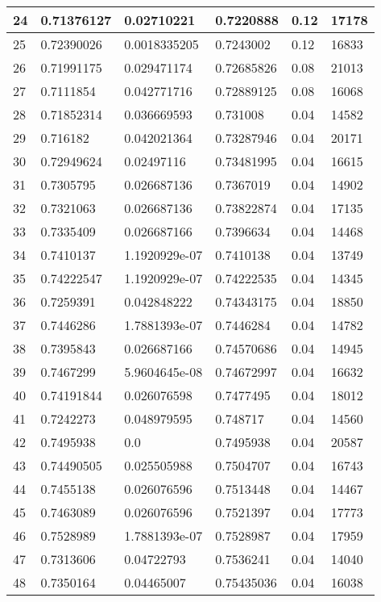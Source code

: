 \begin{longtable}{|l|l|l|l|l|l|}
24 & 0.71376127 & 0.02710221 & 0.7220888 & 0.12 & 17178 \\ \hline 
25 & 0.72390026 & 0.0018335205 & 0.7243002 & 0.12 & 16833 \\ \hline 
26 & 0.71991175 & 0.029471174 & 0.72685826 & 0.08 & 21013 \\ \hline 
27 & 0.7111854 & 0.042771716 & 0.72889125 & 0.08 & 16068 \\ \hline 
28 & 0.71852314 & 0.036669593 & 0.731008 & 0.04 & 14582 \\ \hline 
29 & 0.716182 & 0.042021364 & 0.73287946 & 0.04 & 20171 \\ \hline 
30 & 0.72949624 & 0.02497116 & 0.73481995 & 0.04 & 16615 \\ \hline 
31 & 0.7305795 & 0.026687136 & 0.7367019 & 0.04 & 14902 \\ \hline 
32 & 0.7321063 & 0.026687136 & 0.73822874 & 0.04 & 17135 \\ \hline 
33 & 0.7335409 & 0.026687166 & 0.7396634 & 0.04 & 14468 \\ \hline 
34 & 0.7410137 & 1.1920929e-07 & 0.7410138 & 0.04 & 13749 \\ \hline 
35 & 0.74222547 & 1.1920929e-07 & 0.74222535 & 0.04 & 14345 \\ \hline 
36 & 0.7259391 & 0.042848222 & 0.74343175 & 0.04 & 18850 \\ \hline 
37 & 0.7446286 & 1.7881393e-07 & 0.7446284 & 0.04 & 14782 \\ \hline 
38 & 0.7395843 & 0.026687166 & 0.74570686 & 0.04 & 14945 \\ \hline 
39 & 0.7467299 & 5.9604645e-08 & 0.74672997 & 0.04 & 16632 \\ \hline 
40 & 0.74191844 & 0.026076598 & 0.7477495 & 0.04 & 18012 \\ \hline 
41 & 0.7242273 & 0.048979595 & 0.748717 & 0.04 & 14560 \\ \hline 
42 & 0.7495938 & 0.0 & 0.7495938 & 0.04 & 20587 \\ \hline 
43 & 0.74490505 & 0.025505988 & 0.7504707 & 0.04 & 16743 \\ \hline 
44 & 0.7455138 & 0.026076596 & 0.7513448 & 0.04 & 14467 \\ \hline 
45 & 0.7463089 & 0.026076596 & 0.7521397 & 0.04 & 17773 \\ \hline 
46 & 0.7528989 & 1.7881393e-07 & 0.7528987 & 0.04 & 17959 \\ \hline 
47 & 0.7313606 & 0.04722793 & 0.7536241 & 0.04 & 14040 \\ \hline 
48 & 0.7350164 & 0.04465007 & 0.75435036 & 0.04 & 16038 \\ \hline 

\end{longtable}
